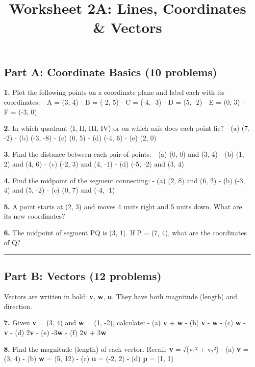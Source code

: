 \documentclass[
  11pt,
]{article}
\title{Worksheet 2A: Lines, Coordinates \& Vectors}
\author{}
\date{}
\begin{document}
\maketitle

\hypertarget{part-a-coordinate-basics-10-problems}{%
\subsection{Part A: Coordinate Basics (10
problems)}\label{part-a-coordinate-basics-10-problems}}

\textbf{1.} Plot the following points on a coordinate plane and label
each with its coordinates: - A = (3, 4) - B = (-2, 5) - C = (-4, -3) - D
= (5, -2) - E = (0, 3) - F = (-3, 0)

\textbf{2.} In which quadrant (I, II, III, IV) or on which axis does
each point lie? - (a) (7, -2) - (b) (-3, -8) - (c) (0, 5) - (d) (-4, 6)
- (e) (2, 0)

\textbf{3.} Find the distance between each pair of points: - (a) (0, 0)
and (3, 4) - (b) (1, 2) and (4, 6) - (c) (-2, 3) and (4, -1) - (d) (-5,
-2) and (3, 4)

\textbf{4.} Find the midpoint of the segment connecting: - (a) (2, 8)
and (6, 2) - (b) (-3, 4) and (5, -2) - (c) (0, 7) and (-4, -1)

\textbf{5.} A point starts at (2, 3) and moves 4 units right and 5 units
down. What are its new coordinates?

\textbf{6.} The midpoint of segment PQ is (3, 1). If P = (7, 4), what
are the coordinates of Q?

\begin{center}\rule{0.5\linewidth}{0.5pt}\end{center}

\hypertarget{part-b-vectors-12-problems}{%
\subsection{Part B: Vectors (12
problems)}\label{part-b-vectors-12-problems}}

Vectors are written in bold: \textbf{v}, \textbf{w}, \textbf{u}. They
have both magnitude (length) and direction.

\textbf{7.} Given \textbf{v} = (3, 4) and \textbf{w} = (1, -2),
calculate: - (a) \textbf{v} + \textbf{w} - (b) \textbf{v} - \textbf{w} -
(c) \textbf{w} - \textbf{v} - (d) 2\textbf{v} - (e) -3\textbf{w} - (f)
2\textbf{v} + 3\textbf{w}

\textbf{8.} Find the magnitude (length) of each vector. Recall:
\textbar{}\textbf{v}\textbar{} = √(v₁² + v₂²) - (a) \textbf{v} = (3, 4)
- (b) \textbf{w} = (5, 12) - (c) \textbf{u} = (-2, 2) - (d) \textbf{p} =
(1, 1)
\end{document}
